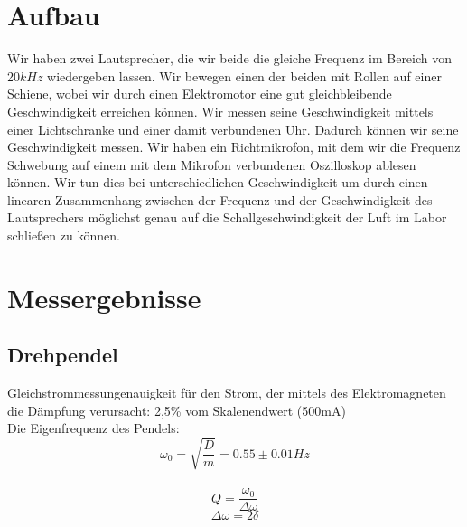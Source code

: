 \documentclass{article}
\begin{document}
\section{Aufbau}
Wir haben zwei Lautsprecher, die wir beide die gleiche Frequenz im Bereich von 20$\si{kHz}$ wiedergeben lassen. Wir bewegen einen der beiden mit Rollen auf einer Schiene, wobei wir durch einen Elektromotor eine gut gleichbleibende Geschwindigkeit erreichen können. Wir messen seine Geschwindigkeit mittels einer Lichtschranke und einer damit verbundenen Uhr. Dadurch können wir seine Geschwindigkeit messen. Wir haben ein Richtmikrofon, mit dem wir die Frequenz Schwebung auf einem mit dem Mikrofon verbundenen Oszilloskop ablesen können. Wir tun dies bei unterschiedlichen Geschwindigkeit um durch einen linearen Zusammenhang zwischen der Frequenz und der Geschwindigkeit des Lautsprechers möglichst genau auf die Schallgeschwindigkeit der Luft im Labor schließen zu können.
\section{Messergebnisse}

\subsection{Drehpendel}
Gleichstrommessungenauigkeit für den Strom, der mittels des Elektromagneten die Dämpfung verursacht: 2,5\% vom Skalenendwert (500mA)\\
Die Eigenfrequenz des Pendels:
$$\omega_0=\sqrt{\frac{D}{m}}=0.55 \pm 0.01 Hz$$
\\



$$Q=\frac{\omega_0}{\Delta \omega}$$
$$\Delta \omega=2\delta$$ 
\end{document}
